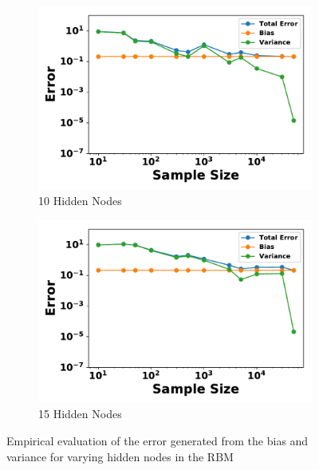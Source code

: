 \documentclass[letterpaper]{article} %
\begin{document}
\begin{figure}[p]
\begin{subfigure}[b]{0.245\textwidth}
              \includegraphics[width=\textwidth]{./RBM_Error_vs_Samples_HiddenNodes10-eps-converted-to.pdf}
              \caption{10 Hidden Nodes}
          \end{subfigure}
          \begin{subfigure}[b]{0.245\textwidth}
              \centering
              \includegraphics[width=\textwidth]{./RBM_Error_vs_Samples_HiddenNodes15-eps-converted-to.pdf}
              \caption{15 Hidden Nodes}
          \end{subfigure}
          \caption{Empirical evaluation of the error generated from the bias and variance for varying hidden nodes in the RBM} \label{fig:RBM_sample_size}
        \end{figure}
        
        
        
\end{document}
